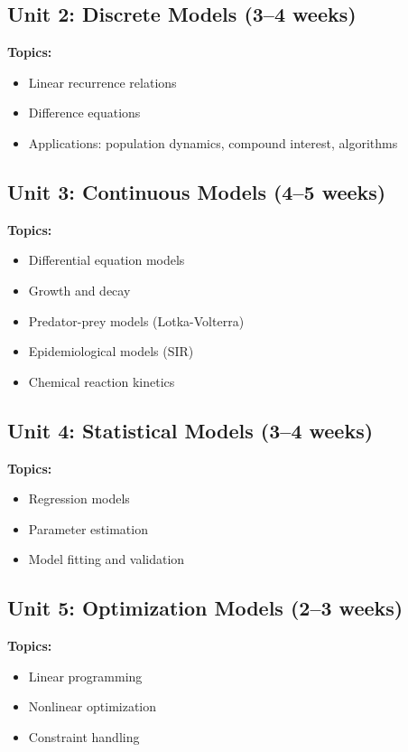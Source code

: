 \documentclass[12pt,oneside]{book}
\begin{document}
\subsection{Unit 2: Discrete Models (3--4 weeks)}

\textbf{Topics:}
\begin{itemize}
    \item Linear recurrence relations
    \item Difference equations
    \item Applications: population dynamics, compound interest, algorithms
\end{itemize}

\subsection{Unit 3: Continuous Models (4--5 weeks)}

\textbf{Topics:}
\begin{itemize}
    \item Differential equation models
    \item Growth and decay
    \item Predator-prey models (Lotka-Volterra)
    \item Epidemiological models (SIR)
    \item Chemical reaction kinetics
\end{itemize}

\subsection{Unit 4: Statistical Models (3--4 weeks)}

\textbf{Topics:}
\begin{itemize}
    \item Regression models
    \item Parameter estimation
    \item Model fitting and validation
\end{itemize}

\subsection{Unit 5: Optimization Models (2--3 weeks)}

\textbf{Topics:}
\begin{itemize}
    \item Linear programming
    \item Nonlinear optimization
    \item Constraint handling
\end{itemize}
\end{document}
